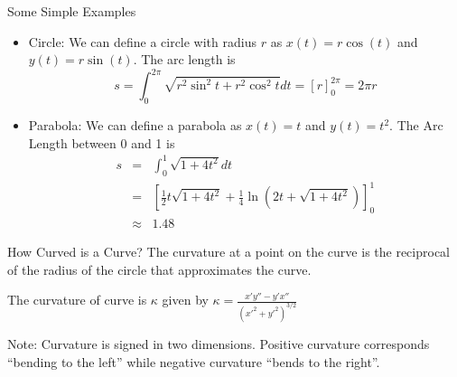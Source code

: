 \documentclass{beamer}
\begin{document}
\begin{frame}{Some Simple Examples}
\begin{itemize}
	
	\item Circle: We can define a circle with radius $r$ as $x(t)=r \cos(t)$ and $y(t)= r \sin(t)$. The arc length is 
	\[
	s = \int_{0}^{2 \pi} \sqrt{r^2 \sin^2 t + r^2 \cos^2 t}dt = \left[r \right]_{0}^{2 \pi} = 2 \pi r
	\]
	
	\item Parabola: We can define a parabola as $x(t)=t$ and $y(t)=t^2$. The Arc Length between 0 and 1 is 
	\begin{eqnarray*}
	s &=& \int_{0}^{1} \sqrt{1+4t^2}dt \\ &=& \left[\frac{1}{2} t\sqrt{1+ 4 t^2} +\frac{1}{4} \ln \left(2 t+\sqrt{1+ 4 t^2} \right) \right]_{0}^1 \\
	&\approx&	 1.48
	\end{eqnarray*}
\end{itemize}

\end{frame}

\begin{frame}{How Curved is a Curve?}
	The curvature at a point on the curve is the reciprocal of the radius of the circle that approximates the curve.
	\begin{definition}[Curvature]
		The curvature of curve is $\kappa$ given by
		$\kappa=\frac{x' y'' - y' x''}{(x'^2+y'^2)^{3/2}}$
	\end{definition}
	Note: Curvature is signed in two dimensions. Positive curvature corresponds ``bending to the left'' while negative curvature ``bends to the right''.
\end{frame}
\end{document}
